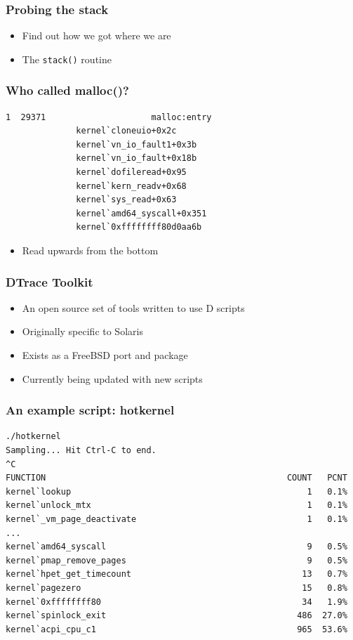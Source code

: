 \documentclass[pdftex]{beamer} %
\begin{document}
\begin{frame}[fragile]
  \frametitle{Probing the stack}
  \begin{itemize}
  \item Find out how we got where we are
  \item The \verb+stack()+ routine
  \end{itemize}
\end{frame}

\begin{frame}[fragile]
  \frametitle{Who called malloc()?}
\begin{lstlisting}
1  29371                     malloc:entry 
              kernel`cloneuio+0x2c
              kernel`vn_io_fault1+0x3b
              kernel`vn_io_fault+0x18b
              kernel`dofileread+0x95
              kernel`kern_readv+0x68
              kernel`sys_read+0x63
              kernel`amd64_syscall+0x351
              kernel`0xffffffff80d0aa6b
\end{lstlisting}
  \begin{itemize}
  \item Read upwards from the bottom
  \end{itemize}
\end{frame}

\begin{frame}
  \frametitle{DTrace Toolkit}
  \begin{itemize}
  \item An open source set of tools written to use D scripts
  \item Originally specific to Solaris
  \item Exists as a FreeBSD port and package
  \item Currently being updated with new scripts
  \end{itemize}
\end{frame}

\begin{frame}[fragile]
  \frametitle{An example script: hotkernel}
\begin{lstlisting}
./hotkernel 
Sampling... Hit Ctrl-C to end.
^C
FUNCTION                                                COUNT   PCNT
kernel`lookup                                               1   0.1%
kernel`unlock_mtx                                           1   0.1%
kernel`_vm_page_deactivate                                  1   0.1%
...
kernel`amd64_syscall                                        9   0.5%
kernel`pmap_remove_pages                                    9   0.5%
kernel`hpet_get_timecount                                  13   0.7%
kernel`pagezero                                            15   0.8%
kernel`0xffffffff80                                        34   1.9%
kernel`spinlock_exit                                      486  27.0%
kernel`acpi_cpu_c1                                        965  53.6%
\end{lstlisting}
\end{frame}
\end{document}

